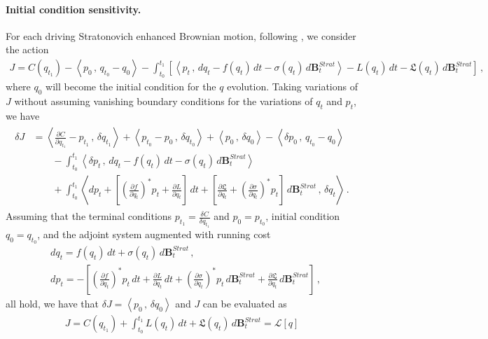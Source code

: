 \documentclass[11pt, oneside]{article}
\numberwithin{equation}{section}
\theoremstyle{definition}
\newcommand{\mc}[1]{\mathcal{#1}}
\newcommand{\mcal}[1]{\mc{#1}}
\newcommand{\scp}[2]{{\left\langle {#1}\, , \, {#2}\right\rangle}}
\def\p{{\partial}}
\def\p{\partial}
\begin{document}
\paragraph{Initial condition sensitivity.}
For each driving Stratonovich enhanced Brownian motion, following \cite{Sanz-Serna2016,TL2024}, we consider the action 
\begin{align}
    J = C(q_{t_1}) - \scp{p_0}{q_{t_0} - q_0} - \int_{t_0}^{t_1} \left[\scp{p_t}{dq_t - f(q_t)\,dt - \sigma(q_t)\, d\mathbf{B}^{Strat}_t}-L(q_t)\,dt - \mathfrak{L}(q_t)\,d\mathbf{B}^{Strat}_t\right]\,,\label{eq:sensitivity J}
\end{align}
where $q_0$ will become the initial condition for the $q$ evolution. Taking variations of $J$ without assuming vanishing boundary conditions for the variations of $q_t$ and $p_t$, we have
\begin{align*}
\begin{split}
    \delta J &= \scp{\frac{\p C}{\p q_{t_1}} - p_{t_1}}{\delta q_{t_1}} + \scp{p_{t_0} - p_0}{\delta q_{t_0}} + \scp{p_0}{\delta q_0} - \scp{\delta p_0}{q_{t_0} - q_0}\\
    & \qquad - \int_{t_0}^{t_1}\scp{\delta p_t}{dq_t - f(q_t)\,dt - \sigma(q_t)\, d\mathbf{B}^{Strat}_t}\\
    & \qquad + \int_{t_0}^{t_1}\scp{d p_t + \left[\left(\frac{\p f}{\p q_t}\right)^* p_t + \frac{\p L}{\p q_t}\right]\,dt + \left[\frac{\p \mathfrak{L}}{\p q_t} + \left(\frac{\p \sigma}{\p q_t}\right)^* p_t \right]\,d\mathbf{B}^{Strat}_t}{\delta q_t}\,.
\end{split}
\end{align*}
Assuming that the terminal conditions $p_{t_1} = \frac{\delta C}{\delta q_{t_1}}$ and $p_0 = p_{t_0}$, initial condition $q_0 = q_{t_0}$, and the adjoint system augmented with running cost 
\begin{align}
    &dq_t = f(q_t)\,dt + \sigma(q_t)\, d\mathbf{B}^{Strat}_t\,, \label{eq:rde forward}\\
    &d p_t = -\left[ \left(\frac{\p f}{\p q_t}\right)^* p_t \,dt + \frac{\p L}{\p q_t} \,dt + \left(\frac{\p \sigma}{\p q_t}\right)^* p_t \,d\mathbf{B}^{Strat}_t + \frac{\p \mathfrak{L}}{\p q_t}\,d\mathbf{B}^{Strat}_t \right]\,, \label{eq:rde adjoint backward}
\end{align}
all hold, we have that $\delta J = \scp{p_0}{\delta q_0}$ and $J$ can be evaluated as 
\begin{align}
    J = C(q_{t_1}) + \int_{t_0}^{t_1} L(q_t)\,dt  + \mathfrak{L}(q_t)\,d\mathbf{B}^{Strat}_t = \mcal{L}[q] 
\end{align}
\end{document}
